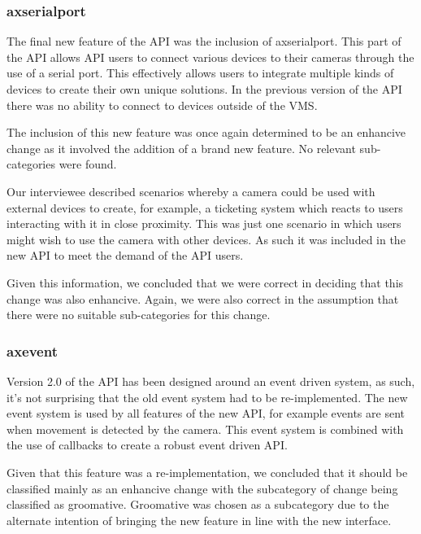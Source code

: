 \documentclass{sig-alternate}
\begin{document}
\subsubsection{axserialport}

The final new feature of the API was the inclusion of axserialport. This part of the API allows API users to connect various devices to their cameras through the use of a serial port. This effectively allows users to integrate multiple kinds of devices to create their own unique solutions. In the previous version of the API there was no ability to connect to devices outside of the VMS.

The inclusion of this new feature was once again determined to be an enhancive change as it involved the addition of a brand new feature. No relevant sub-categories were found.

Our interviewee described scenarios whereby a camera could be used with external devices to create, for example, a ticketing system which reacts to users interacting with it in close proximity. This was just one scenario in which users might wish to use the camera with other devices. As such it was included in the new API to meet the demand of the API users.

Given this information, we concluded that we were correct in deciding that this change was also enhancive. Again, we were also correct in the assumption that there were no suitable sub-categories for this change.

\subsubsection{axevent}

Version 2.0 of the API has been designed around an event driven system, as such, it's not surprising that the old event system had to be re-implemented. The new event system is used by all features of the new API, for example events are sent when movement is detected by the camera. This event system is combined with the use of callbacks to create a robust event driven API.

Given that this feature was a re-implementation, we concluded that it should be classified mainly as an enhancive change with the subcategory of change being classified as groomative. Groomative was chosen as a subcategory due to the alternate intention of bringing the new feature in line with the new interface.
\end{document}
